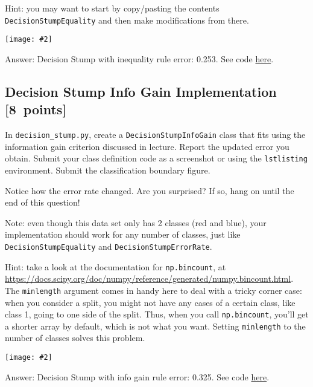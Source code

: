 \documentclass{article}
\newcommand{\blu}[1]{{\textcolor{blu}{#1}}}
\newenvironment{answer}{\par\begingroup\color{gre}Answer: }{\endgroup}
\let\ask\blu
\newcommand\pts[1]{\textcolor{pointscolour}{[#1~points]}}
\newcommand{\centerfig}[2]{\begin{center}\texttt{[image: \#2]}\end{center}}
\begin{document}
  Hint: you may want to start by copy/pasting the contents \texttt{DecisionStumpEquality} and then make modifications from there. %

  \centerfig{0.7}{./figs/q6_2_decisionBoundary}
  \begin{answer}
    Decision Stump with inequality rule error: 0.253. See code \hyperref[code6.2]{here}.
  \end{answer}
  



  \subsection{Decision Stump Info Gain Implementation \pts{8}}\label{sec6.3}

  In \texttt{decision\string_stump.py}, \ask{create a \texttt{DecisionStumpInfoGain} class that
  fits using the information gain criterion discussed in lecture.
  Report the updated error you obtain.
  Submit your class definition code as a screenshot or using the \texttt{lstlisting} environment.
  Submit the classification boundary figure.}

  Notice how the error rate changed. Are you surprised? If so, hang on until the end of this question!

  Note: even though this data set only has 2 classes (red and blue), your implementation should work
  for any number of classes, just like \texttt{DecisionStumpEquality} and \texttt{DecisionStumpErrorRate}.

  Hint: take a look at the documentation for \texttt{np.bincount}, at \\
  \url{https://docs.scipy.org/doc/numpy/reference/generated/numpy.bincount.html}.
  The \texttt{minlength} argument comes in handy here to deal with a tricky corner case:
  when you consider a split, you might not have any cases of a certain class, like class 1,
  going to one side of the split. Thus, when you call \texttt{np.bincount}, you'll get
  a shorter array by default, which is not what you want. Setting \texttt{minlength} to the
  number of classes solves this problem.

  \centerfig{0.7}{./figs/q6_3_decisionBoundary}
  \begin{answer}
    Decision Stump with info gain rule error: 0.325. See code \hyperref[code6.3]{here}.
  \end{answer}
  
\end{document}
